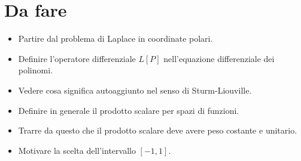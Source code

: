 \documentclass[11pt, a4paper]{scrartcl}
\theoremstyle{definition}
\numberwithin{esempio}{section}
\theoremstyle{definition}
\numberwithin{obs}{section}
\numberwithin{nota}{section}
\numberwithin{equation}{subsection}
\begin{document}
\newpage
\section{Da fare}


\begin{itemize}
	\item Partire dal problema di Laplace in coordinate polari. 
	\item Definire l'operatore differenziale $L[P]$ nell'equazione differenziale dei polinomi.
	\item Vedere cosa significa autoaggiunto nel senso di Sturm-Liouville.
	\item Definire in generale il prodotto scalare per spazi di funzioni.
	\item Trarre da questo che il prodotto scalare deve avere peso costante e unitario.
	\item Motivare la scelta dell'intervallo $[-1,1]$.
\end{itemize}
\end{document}
